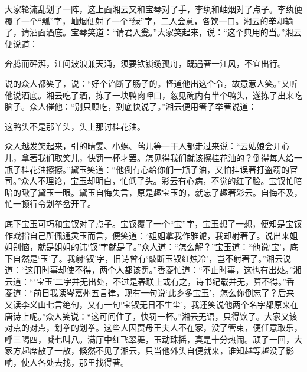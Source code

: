 \begin{parag}
    大家轮流乱划了一阵，这上面湘云又和宝琴对了手，李纨和岫烟对了点子。李纨便覆了一个“瓢”字，岫烟便射了一个“绿”字，二人会意，各饮一口。湘云的拳却输了，请酒面酒底。宝琴笑道：“请君入瓮。”大家笑起来，说：“这个典用的当。”湘云便说道：
\end{parag}


\begin{poem}
    \begin{pl}奔腾而砰湃，江间波浪兼天涌，须要铁锁缆孤舟，既遇著一江风，不宜出行。\end{pl}

\end{poem}


\begin{parag}
    说的众人都笑了，说：“好个诌断了肠子的。怪道他出这个令，故意惹人笑。”又听他说酒底。湘云吃了酒，拣了一块鸭肉呷口，忽见碗内有半个鸭头，遂拣了出来吃脑子。众人催他：“别只顾吃，到底快说了。”湘云便用箸子举著说道：
\end{parag}


\begin{poem}
    \begin{pl}这鸭头不是那丫头，头上那讨桂花油。\end{pl}
\end{poem}


\begin{parag}
    众人越发笑起来，引的晴雯、小螺、莺儿等一干人都走过来说：“云姑娘会开心儿，拿著我们取笑儿，快罚一杯才罢。怎见得我们就该擦桂花油的？倒得每人给一瓶子桂花油擦擦。”黛玉笑道：“他倒有心给你们一瓶子油，又怕挂误著打盗窃的官司。”众人不理论，宝玉却明白，忙低了头。彩云有心病，不觉的红了脸。宝钗忙暗暗的瞅了黛玉一眼。黛玉自悔失言，原是趣宝玉的，就忘了趣著彩云。自悔不及，忙一顿行令划拳岔开了。
\end{parag}


\begin{parag}
    底下宝玉可巧和宝钗对了点子。宝钗覆了一个“宝”字，宝玉想了一想，便知是宝钗作戏指自己所佩通灵玉而言，便笑道：“姐姐拿我作雅谑，我却射著了。说出来姐姐别恼，就是姐姐的讳‘钗’字就是了。”众人道：“怎么解？”宝玉道：“他说‘宝’，底下自然是‘玉’了。我射‘钗’字，旧诗曾有‘敲断玉钗红烛冷’，岂不射著了。”湘云说道：“这用时事却使不得，两个人都该罚。”香菱忙道：“不止时事，这也有出处。”湘云道：“‘宝玉’二字并无出处，不过是春联上或有之，诗书纪载并无，算不得。”香菱道：“前日我读岑嘉州五言律，现有一句说‘此乡多宝玉’，怎么你倒忘了？后来又读李义山七言绝句，又有一句‘宝钗无日不生尘’，我还笑说他两个名字都原来在唐诗上呢。”众人笑说：“这可问住了，快罚一杯。”湘云无语，只得饮了。大家又该对点的对点，划拳的划拳。这些人因贾母王夫人不在家，没了管束，便任意取乐，呼三喝四，喊七叫八。满厅中红飞翠舞，玉动珠摇，真是十分热闹。顽了一回，大家方起席散了一散，倏然不见了湘云，只当他外头自便就来，谁知越等越没了影响，使人各处去找，那里找得著。
\end{parag}


